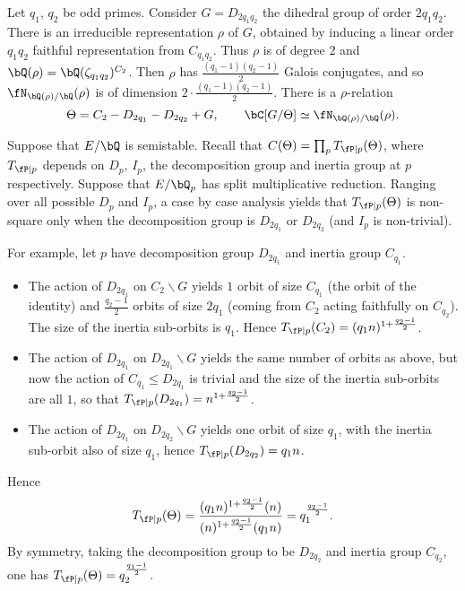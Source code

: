 \begin{example}[Dihedral]
    Let $q_1$, $q_2$ be odd primes. Consider $G = D_{2 q_1 q_2}$ the dihedral group of order $2 q_1 q_2$. There is an irreducible representation $\rho$ of $G$, obtained by inducing a linear order $q_1 q_2$ faithful representation from $C_{q_1 q_2}$. Thus $\rho$ is of degree $2$ and $\bQ(\rho) = \bQ(\zeta_{q_1 q_2})^{C_2}$. Then $\rho$ has $\frac{(q_1 - 1)(q_2 - 1)}{2}$ Galois conjugates, and so $\repnorm{\rho}$ is of dimension $2 \cdot \frac{(q_1 - 1)(q_2 - 1)}{2}$. There is a $\rho$-relation $$\Theta = C_2 - D_{2 q_1} - D_{2 q_2} + G, \qquad \bC[G / \Theta] \simeq \repnorm{\rho}.$$ 

    Suppose that $E / \bQ$ is semistable. Recall that $C(\Theta) = \prod_p T_{\fP \mid p}(\Theta)$, where $T_{\fP \mid p}$ depends on $D_p$, $I_p$, the decomposition group and inertia group at $p$ respectively. Suppose that $E / \bQ_p$ has split multiplicative reduction. Ranging over all possible $D_p$ and $I_p$, a case by case analysis yields that $T_{\fP \mid p}(\Theta)$ is non-square only when the decomposition group is $D_{2 q_1}$ or $D_{2 q_2}$ (and $I_p$ is non-trivial). 

    For example, let $p$ have decomposition group $D_{2 q_1}$ and inertia group $C_{q_1}$.
        \begin{itemize}[--]
            \setlength\itemsep{0em}
            \item The action of $D_{2 q_1}$ on $C_2 \backslash G$ yields $1$ orbit of size $C_{q_1}$ (the orbit of the identity) and $\frac{q_2 - 1}{2}$ orbits of size $2q_1$ (coming from $C_2$ acting faithfully on $C_{q_2}$). The size of the inertia sub-orbits is $q_1$. Hence $T_{\fP \mid p}(C_2) = (q_1 n)^{1 + \frac{q_2 - 1}{2}}$.
            \item The action of $D_{2 q_1}$ on $D_{2 q_1} \backslash G$ yields the same number of orbits as above, but now the action of $C_{q_1} \leq D_{2 q_1}$ is trivial and the size of the inertia sub-orbits are all $1$, so that $T_{\fP \mid p}(D_{2 q_1}) = n^{1 + \frac{q_2 - 1}{2}}$.
            \item The action of $D_{2 q_1}$ on $D_{2 q_2} \backslash G$ yields one orbit of size $q_1$, with the inertia sub-orbit also of size $q_1$, hence $T_{\fP \mid p}(D_{2 q_2}) = q_1 n$.
        \end{itemize}
    Hence
    \[ T_{\fP \mid p}(\Theta) = \frac{(q_1 n )^{1 + \frac{q_2 - 1}{2}} (n)}{(n)^{1 + \frac{q_2 - 1}{2}} (q_1 n)} = q_1^{\frac{q_2 - 1}{2}} .\] 
    By symmetry, taking the decomposition group to be $D_{2 q_2}$ and inertia group $C_{q_2}$, one has 
     $T_{\fP \mid p}(\Theta) = q_2^{\frac{q_1 - 1}{2}}$.


\end{example}
